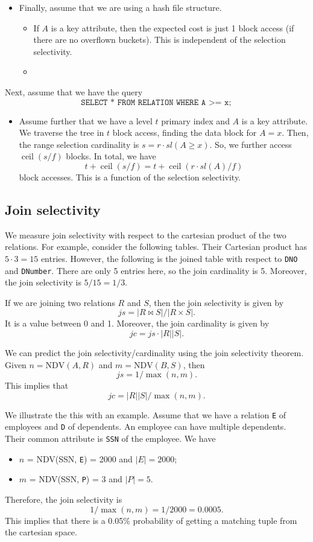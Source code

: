 \documentclass[a4paper, openany]{memoir}
\theoremstyle{definition}
\theoremstyle{plain}
\begin{document}
\begin{itemize}
    \item Finally, assume that we are using a hash file structure.
    \begin{itemize}
        \item If $A$ is a key attribute, then the expected cost is just 1 block access (if there are no overflown buckets). This is independent of the selection selectivity.
        \item 
    \end{itemize}
\end{itemize}

Next, assume that we have the query
\[\texttt{SELECT * FROM RELATION WHERE A >= x};\]
\begin{itemize}
    \item Assume further that we have a level $t$ primary index and $A$ is a key attribute. We traverse the tree in $t$ block access, finding the data block for $A = x$. Then, the range selection cardinality is $s = r \cdot \textit{sl}(A \geq x)$. So, we further access $\operatorname{ceil}(s/f)$ blocks. In total, we have
    \[t + \operatorname{ceil}(s/f) = t + \operatorname{ceil}(r \cdot \textit{sl}(A)/f)\]
    block accesses. This is a function of the selection selectivity.
\end{itemize}

\subsection{Join selectivity}
We measure join selectivity with respect to the cartesian product of the two relations. For example, consider the following tables.
Their Cartesian product has $5 \cdot 3 = 15$ entries. However, the following is the joined table with respect to \texttt{DNO} and \texttt{DNumber}.
There are only 5 entries here, so the join cardinality is 5. Moreover, the join selectivity is $5/15 = 1/3$.

If we are joining two relations $R$ and $S$, then the join selectivity is given by
\[\textit{js} = |R \bowtie S|/|R \times S|.\]
It is a value between 0 and 1. Moreover, the join cardinality is given by
\[\textit{jc} = \textit{js} \cdot |R| |S|.\]

We can predict the join selectivity/cardinality using the join selectivity theorem. Given $n = \text{NDV}(A, R)$ and $m = \text{NDV}(B, S)$, then
\[\textit{js} = 1/\max(n, m).\]
This implies that 
\[\textit{jc} = |R| |S| / \max(n, m).\]

We illustrate the this with an example. Assume that we have a relation \texttt{E} of employees and \texttt{D} of dependents. An employee can have multiple dependents. Their common attribute is \texttt{SSN} of the employee. We have
\begin{itemize}
    \item $n$ = NDV(SSN, \texttt{E}) = 2000 and $|E| = 2000$;
    \item $m$ = NDV(SSN, \texttt{P}) = 3 and $|P| = 5$.
\end{itemize}
Therefore, the join selectivity is
\[1/\max(n, m) = 1/2000 = 0.0005.\]
This implies that there is a 0.05\% probability of getting a matching tuple from the cartesian space.
\end{document}
